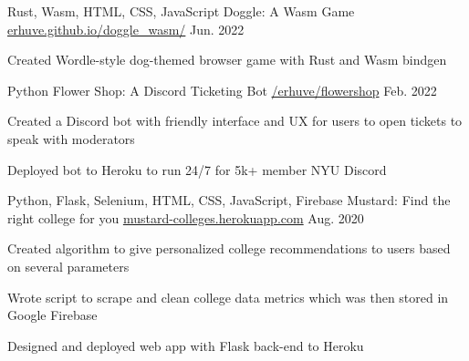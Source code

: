 

\begin{cventries}
  \cventry
    {Rust, Wasm, HTML, CSS, JavaScript} %
    {Doggle: A Wasm Game} %
    {\href{https://erhuve.github.io/doggle_wasm}{erhuve.github.io/doggle\_wasm/}} %
    {Jun. 2022} %
    {
      \begin{cvitems} %
        \item {Created Wordle-style dog-themed browser game with Rust and Wasm bindgen}
      \end{cvitems}
    }
    
  \cventry
    {Python} %
    {Flower Shop: A Discord Ticketing Bot} %
    {\href{https://github.com/erhuve/flowershop}{/erhuve/flowershop}} %
    {Feb. 2022} %
    {
      \begin{cvitems} %
        \item {Created a Discord bot with friendly interface and UX for users to open tickets to speak with moderators}
        \item {Deployed bot to Heroku to run 24/7 for 5k+ member NYU Discord}
      \end{cvitems}
    }

  \cventry
    {Python, Flask, Selenium, HTML, CSS, JavaScript, Firebase} %
    {Mustard: Find the right college for you} %
    {\href{http://mustard-colleges.herokuapp.com/}{mustard-colleges.herokuapp.com}} %
    {Aug. 2020} %
    {
      \begin{cvitems} %
        \item {Created algorithm to give personalized college recommendations to users based on several parameters}
        \item {Wrote script to scrape and clean college data metrics which was then stored in Google Firebase}
        \item {Designed and deployed web app with Flask back-end to Heroku}
      \end{cvitems}
    }
\end{cventries}
